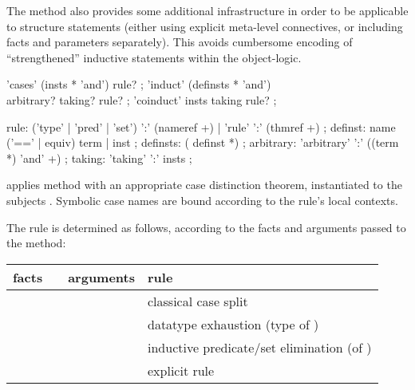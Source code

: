 \begin{isabellebody}
\begin{isamarkuptext}
  The \hyperlink{method.induct}{\mbox{}} method also provides some additional
  infrastructure in order to be applicable to structure statements
  (either using explicit meta-level connectives, or including facts
  and parameters separately).  This avoids cumbersome encoding of
  ``strengthened'' inductive statements within the object-logic.

  \begin{rail}
    'cases' (insts * 'and') rule?
    ;
    'induct' (definsts * 'and') \\ arbitrary? taking? rule?
    ;
    'coinduct' insts taking rule?
    ;

    rule: ('type' | 'pred' | 'set') ':' (nameref +) | 'rule' ':' (thmref +)
    ;
    definst: name ('==' | equiv) term | inst
    ;
    definsts: ( definst *)
    ;
    arbitrary: 'arbitrary' ':' ((term *) 'and' +)
    ;
    taking: 'taking' ':' insts
    ;
  \end{rail}

  \begin{descr}

  \item [\hyperlink{method.cases}{\mbox{\isa{cases}}}~\isa{{\isachardoublequote}insts\ R{\isachardoublequote}}] applies method \hyperlink{method.rule}{\mbox{}} with an appropriate case distinction theorem, instantiated to
  the subjects .  Symbolic case names are bound according
  to the rule's local contexts.

  The rule is determined as follows, according to the facts and
  arguments passed to the \hyperlink{method.cases}{\mbox{}} method:

  \medskip
  \begin{tabular}{llll}
    facts           &                 & arguments   & rule \\\hline
                    & \hyperlink{method.cases}{\mbox{\isa{cases}}} &             & classical case split \\
                    & \hyperlink{method.cases}{\mbox{\isa{cases}}} & \isa{t}   & datatype exhaustion (type of \isa{t}) \\
    \isa{{\isachardoublequote}{\isasymturnstile}\ A\ t{\isachardoublequote}} & \hyperlink{method.cases}{\mbox{\isa{cases}}} & \isa{{\isachardoublequote}{\isasymdots}{\isachardoublequote}} & inductive predicate/set elimination (of \isa{A}) \\
    \isa{{\isachardoublequote}{\isasymdots}{\isachardoublequote}}     & \hyperlink{method.cases}{\mbox{\isa{cases}}} & \isa{{\isachardoublequote}{\isasymdots}\ rule{\isacharcolon}\ R{\isachardoublequote}} & explicit rule \isa{R} \\
  \end{tabular}
  \medskip


\end{descr}
\end{isamarkuptext}
\end{isabellebody}
